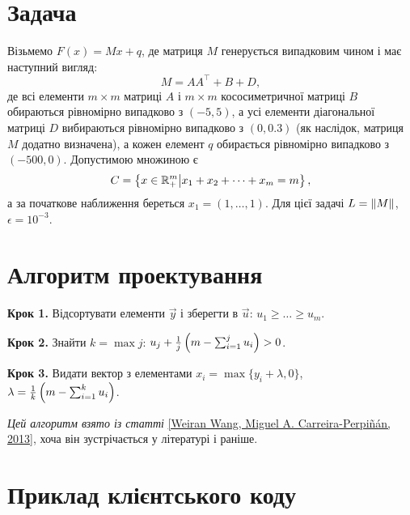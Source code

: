\section{Задача}

\begin{problem}
    Візьмемо $F(x) = M x + q$, де матриця $M$ генерується випадковим чином і має наступний  вигляд:
    \begin{equation}
        M = A A^\intercal + B + D,
    \end{equation}
    де всі елементи $m \times m$ матриці $A$ і $m \times m$ кососиметричної матриці $B$ обираються рівномірно випадково з $(-5, 5)$, а усі елементи діагональної матриці $D$ вибираються рівномірно випадково з $(0, 0.3)$ (як наслідок, матриця $M$ додатно визначена), а кожен елемент $q$ обирається рівномірно випадково з $(-500, 0)$. Допустимою множиною є 
    \begin{equation}
        C = \left\{ x \in \mathbb{R}_+^m \middle| x_1 + x_2 + \dots + x_m = m \right\},
    \end{equation}
    а за початкове наближення береться $x_1 = (1, \dots, 1)$. Для цієї задачі $L = \left\| M \right\|$, $\epsilon = 10^{-3}$.
\end{problem}

\section{Алгоритм проектування}

\begin{algorithm}\nothing

    \textbf{Крок 1.} Відсортувати елементи $\vec y$ і зберегти в $\vec u$: $u_1 \ge \dots \ge u_m$. \medskip
        
    \textbf{Крок 2.} Знайти $k = \max j$: $u_j + \frac{1}{j} \left( m - \operatorname*{\sum}_{i = 1}^j u_i \right) > 0$. \medskip
        
    \textbf{Крок 3.} Видати вектор з елементами $x_i = \max\{y_i + \lambda, 0\}$, $\lambda = \frac{1}{k} \left( m - \operatorname*{\sum}_{i = 1}^k u_i \right)$.
\end{algorithm}

\emph{Цей алгоритм взято із статті} \href{https://arxiv.org/pdf/1309.1541v1.pdf}{[Weiran Wang, Miguel A. Carreira-Perpi\~n\'an, 2013]}, хоча він зустрічається у літературі і раніше.

\section{Приклад клієнтського коду}

